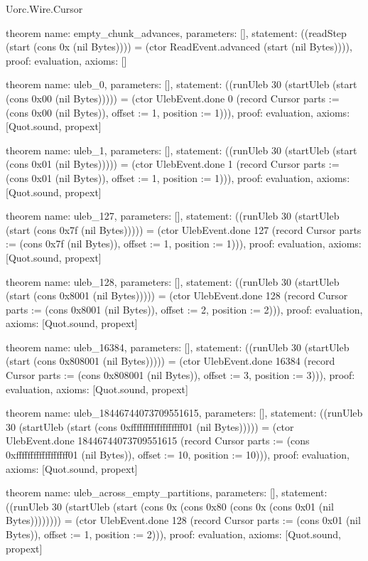 \begin{lexlean}{Uorc.Wire.Cursor}
\begin{semanticmodule}
theorem{
  name: empty_chunk_advances,
  parameters: [],
  statement: ((readStep (start (cons 0x (nil Bytes)))) = (ctor ReadEvent.advanced (start (nil Bytes)))),
  proof: evaluation{},
  axioms: []
}

theorem{
  name: uleb_0,
  parameters: [],
  statement: ((runUleb 30 (startUleb (start (cons 0x00 (nil Bytes))))) = (ctor UlebEvent.done 0 (record Cursor {parts := (cons 0x00 (nil Bytes)), offset := 1, position := 1}))),
  proof: evaluation{},
  axioms: [Quot.sound, propext]
}

theorem{
  name: uleb_1,
  parameters: [],
  statement: ((runUleb 30 (startUleb (start (cons 0x01 (nil Bytes))))) = (ctor UlebEvent.done 1 (record Cursor {parts := (cons 0x01 (nil Bytes)), offset := 1, position := 1}))),
  proof: evaluation{},
  axioms: [Quot.sound, propext]
}

theorem{
  name: uleb_127,
  parameters: [],
  statement: ((runUleb 30 (startUleb (start (cons 0x7f (nil Bytes))))) = (ctor UlebEvent.done 127 (record Cursor {parts := (cons 0x7f (nil Bytes)), offset := 1, position := 1}))),
  proof: evaluation{},
  axioms: [Quot.sound, propext]
}

theorem{
  name: uleb_128,
  parameters: [],
  statement: ((runUleb 30 (startUleb (start (cons 0x8001 (nil Bytes))))) = (ctor UlebEvent.done 128 (record Cursor {parts := (cons 0x8001 (nil Bytes)), offset := 2, position := 2}))),
  proof: evaluation{},
  axioms: [Quot.sound, propext]
}

theorem{
  name: uleb_16384,
  parameters: [],
  statement: ((runUleb 30 (startUleb (start (cons 0x808001 (nil Bytes))))) = (ctor UlebEvent.done 16384 (record Cursor {parts := (cons 0x808001 (nil Bytes)), offset := 3, position := 3}))),
  proof: evaluation{},
  axioms: [Quot.sound, propext]
}

theorem{
  name: uleb_18446744073709551615,
  parameters: [],
  statement: ((runUleb 30 (startUleb (start (cons 0xffffffffffffffffff01 (nil Bytes))))) = (ctor UlebEvent.done 18446744073709551615 (record Cursor {parts := (cons 0xffffffffffffffffff01 (nil Bytes)), offset := 10, position := 10}))),
  proof: evaluation{},
  axioms: [Quot.sound, propext]
}

theorem{
  name: uleb_across_empty_partitions,
  parameters: [],
  statement: ((runUleb 30 (startUleb (start (cons 0x (cons 0x80 (cons 0x (cons 0x01 (nil Bytes)))))))) = (ctor UlebEvent.done 128 (record Cursor {parts := (cons 0x01 (nil Bytes)), offset := 1, position := 2}))),
  proof: evaluation{},
  axioms: [Quot.sound, propext]
}


\end{semanticmodule}
\end{lexlean}
